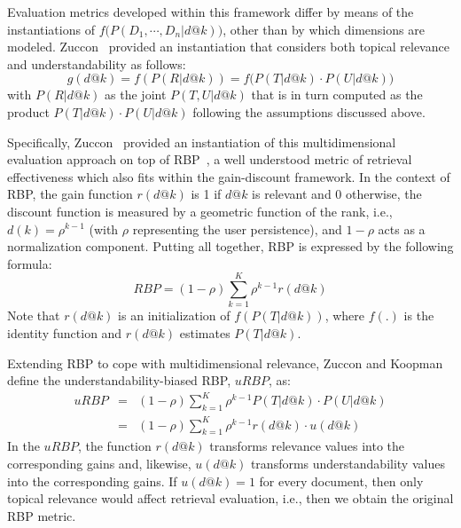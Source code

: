 Evaluation metrics developed within this framework differ by means of the instantiations of $f\big(P(D_1, \cdots, D_n|d@k)\big)$, other than by which dimensions are modeled. Zuccon~\cite{zuccon16} provided an instantiation that considers both topical relevance and understandability as follows:
%
\begin{equation}
g(d@k) = f(P(R|d@k)) = f\big(P(T|d@k) \cdot P(U|d@k)\big)
\end{equation}
%
with $P(R|d@k)$ as the joint $P(T,U|d@k)$ that is in turn computed as the product $P(T|d@k) \cdot P(U|d@k)$ following the assumptions discussed above.

Specifically, Zuccon~\cite{zuccon16} provided an instantiation of this multidimensional evaluation approach on top of RBP~\cite{moffat08}, a well understood metric of retrieval effectiveness which also fits within the gain-discount framework. 
In the context of RBP, the gain function $r(d@k)$ is 1 if $d@k$ is relevant and 0 otherwise, the discount function is measured by a geometric function of the rank, i.e., $d(k) = \rho^{k-1}$ (with $\rho$ representing the user persistence), and $1-\rho$ acts as a normalization component. Putting all together, RBP is expressed by the following formula:
\begin{equation}
RBP = (1-\rho) \sum_{k=1}^{K} \rho^{k-1} r(d@k)
\label{eq:RBP}
\end{equation}
%
Note that $r(d@k)$ is an initialization of $f(P(T|d@k))$, where $f(.)$ is the identity function and $r(d@k)$ estimates $P(T|d@k)$. 

Extending RBP to cope with multidimensional relevance, Zuccon and Koopman~\cite{zuccon14} define the understandability-biased RBP, $uRBP$, as: 
%
\begin{eqnarray}
uRBP &=& (1-\rho) \sum_{k=1}^{K} \rho^{k-1} P(T|d@k) \cdot P(U|d@k)\\ 
&=& (1-\rho) \sum_{k=1}^{K} \rho^{k-1} r(d@k) \cdot u(d@k)
\label{eq:RBP}
\end{eqnarray}
%
In the $uRBP$, the function $r(d@k)$ transforms relevance values into the corresponding gains and, likewise, $u(d@k)$ transforms understandability values into the corresponding gains. 
If $u(d@k)=1$ for every document, then only topical relevance would affect retrieval evaluation, i.e.,  then we obtain the original RBP metric.

